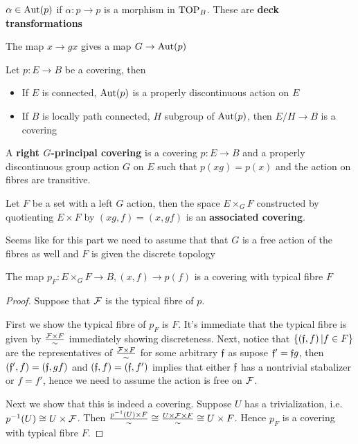 $\alpha\in\operatorname{Aut}(p)$ if $\alpha:p\to p$ is a morphism in $\operatorname{TOP}_B$. These are \textbf{deck transformations}

The map $x\to gx$ gives a map $G\to\operatorname{Aut}(p)$

\begin{thm*}
    Let $p:E\to B$ be a covering, then
    \begin{itemize}
        \item If $E$ is connected, $\operatorname{Aut}(p)$ is a properly discontinuous action on $E$
        \item If $B$ is locally path connected, $H$ subgroup of $\operatorname{Aut}(p)$, then $E/H\to B$ is a covering
    \end{itemize}
\end{thm*}

A \textbf{right $G$-principal covering} is a covering $p:E\to B$ and a properly discontinuous group action $G$ on $E$ such that $p(xg)=p(x)$ and the action on fibres are transitive.

Let $F$ be a set with a left $G$ action, then the space $E\times_GF$ constructed by quotienting $E\times F$ by $\left(xg,f\right)=\left(x,gf\right)$ is an \textbf{associated covering}.

\begin{rmk}
    Seems like for this part we need to assume that that $G$ is a free action of the fibres as well and $F$ is given the discrete topology
\end{rmk}

\begin{thm*}
    The map $p_F:E\times_GF\to B,(x,f)\to p(f)$ is a covering with typical fibre $F$
\end{thm*}

\begin{proof}
    Suppose that $\mathcal F$ is the typical fibre of $p$.

    First we show the typical fibre of $p_F$ is $F$. It's immediate that the typical fibre is given by $\frac{\mathcal F\times F}{\sim}$ immediately showing discreteness. Next, notice that $\left\{\left(\mathfrak f,f\right)|f\in F\right\}$ are the representatives of $\frac{\mathcal F\times F}{\sim}$ for some arbitrary $\mathfrak f$ as supose $\mathfrak f'=\mathfrak fg$, then $\left(\mathfrak f',f\right)=\left(\mathfrak f,gf\right)$ and $\left(\mathfrak f,f\right)=\left(\mathfrak f,f'\right)$ implies that either $\mathfrak f$ has a nontrivial stabalizer or $f=f'$, hence we need to assume the action is free on $\mathcal F$.

    Next we show that this is indeed a covering. Suppose $U$ has a trivialization, i.e. $p^{-1}(U)\cong U\times\mathcal F$. Then $\frac{p^{-1}(U)\times F}{\sim}\cong\frac{U\times\mathcal F\times F}{\sim}\cong U\times F$. Hence $p_F$ is a covering with typical fibre $F$.
\end{proof}

